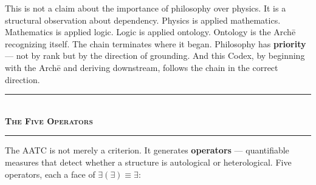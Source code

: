 \documentclass[10pt, openany, oneside]{book}
\renewcommand{\normalsize}{\fontsize{10}{13}\selectfont}
\begin{document}
\vspace{0.8em}

\noindent This is not a claim about the importance of philosophy over physics. It is a structural observation about dependency. Physics is applied mathematics. Mathematics is applied logic. Logic is applied ontology. Ontology is the Arch\={e} recognizing itself. The chain terminates where it began. Philosophy has \textbf{priority} --- not by rank but by the direction of grounding. And this Codex, by beginning with the Arch\={e} and deriving downstream, follows the chain in the correct direction.

\vspace{1.5em}


\begin{center}
    \rule{0.3\textwidth}{0.4pt}\\[0.5em]
    {\normalsize\bfseries\scshape The Five Operators}\\[0.3em]
    \rule{0.3\textwidth}{0.4pt}
\end{center}

\vspace{1em}

\noindent The AATC is not merely a criterion. It generates \textbf{operators} --- quantifiable measures that detect whether a structure is autological or heterological. Five operators, each a face of $\exists(\exists) \equiv \exists$:

\vspace{0.5em}
\end{document}
